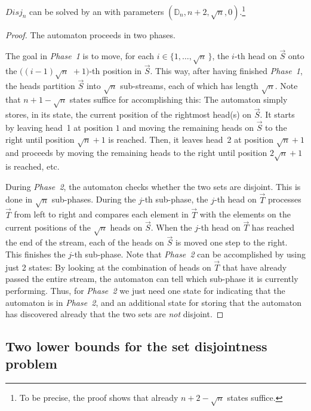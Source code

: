 \documentclass[proceedings]{stacs}
\theoremstyle{plain}\newtheorem{satz}[thm]{Satz}
\theoremstyle{definition}\newtheorem{crucial}[thm]{Crucial Definition}
\newcommand{\vek}[1]{\vec{#1}}
\newcommand{\set}[1]{\ensuremath{\{ #1 \}}}
\newcommand{\DI}{\ensuremath{\mathbb{D}}}
\newcommand{\Disj}{\ensuremath{\textit{Disj}}}
\newcommand{\aut}{\text{mp2s-automaton}}
\begin{document}
\begin{proposition}\label{prop:upper-bound-sqrt}
 $\Disj_n$ can be solved by an \aut{} with parameters
 $(\DI_n,n{+}2,\sqrt{n},0)$.\footnote{To be precise, the proof shows that already 
    $n+2-\sqrt{n}$ states suffice.}
\end{proposition}
\begin{proof}
The automaton proceeds in two phases. 

The goal in \emph{Phase~1} is to move, 
for each $i\in\set{1,\ldots,\sqrt{n}\,}$, the $i$-th head on $\vek{S}$ onto
the $\big((i{-}1)\sqrt{n}\,\, +1\big)$-th position in $\vek{S}$. 
This way, after having finished \emph{Phase~1}, the heads 
partition $\vek{S}$ into $\sqrt{n}$ sub-streams, each of
which has length $\sqrt{n}$.
Note that $n+1-\sqrt{n}$ states suffice for accomplishing this: The automaton simply
stores, in its state, the current position of the rightmost head(s) on $\vek{S}$.
It starts by
leaving head~1 at position $1$ and moving the remaining heads on $\vek{S}$
to the right until position $\sqrt{n}+1$ is reached. 
Then, it leaves head~2 at position $\sqrt{n}+1$ and proceeds by moving the
remaining heads to the right until position $2\sqrt{n}+1$ is reached, etc.

During \emph{Phase~2}, the automaton checks whether the two sets are disjoint.
This is done in $\sqrt{n}$ sub-phases. During the $j$-th sub-phase, the
$j$-th head on $\vek{T}$ processes $\vek{T}$ from left to right and compares
each element in $\vek{T}$ with the elements on the current positions of
the $\sqrt{n}$ heads on $\vek{S}$. When the $j$-th head on $\vek{T}$ has 
reached the end of the stream, each of the heads on $\vek{S}$ is moved one
step to the right. This finishes the $j$-th sub-phase.
Note that \emph{Phase~2} can be accomplished by using just 2 states:
By looking at the combination of heads on $\vek{T}$ that have already 
passed the entire stream, the automaton can tell which sub-phase it is 
currently performing. Thus, for \emph{Phase~2} we just need
one state for indicating that the automaton is in \emph{Phase~2}, 
and an additional state for storing that the
automaton has discovered already that the two sets are \emph{not} disjoint.
\end{proof}



\subsection{Two lower bounds for the set disjointness problem}\label{subsec:lowerbound}
\end{document}
